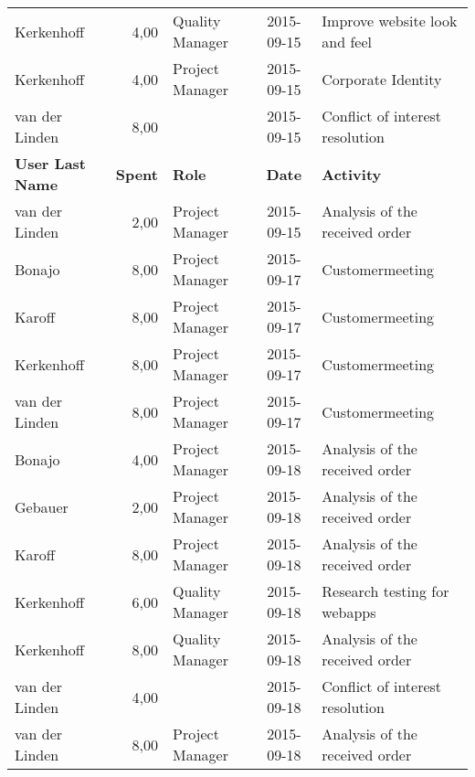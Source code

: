 \begin{longtable}{ l r p{2cm} c p{4cm}}
		Kerkenhoff              & 4,00           & Quality Manager & 2015-09-15    & Improve website look and feel                   \\
		Kerkenhoff              & 4,00           & Project Manager & 2015-09-15    & Corporate Identity                              \\
		van der Linden          & 8,00           &                 & 2015-09-15    & Conflict of interest resolution                 \\
		\textbf{User Last Name} & \textbf{Spent} & \textbf{Role} & \textbf{Date} & \textbf{Activity} \\
		\hline
		van der Linden          & 2,00           & Project Manager & 2015-09-15    & Analysis of the received order                  \\
		Bonajo                  & 8,00           & Project Manager & 2015-09-17    & Customermeeting                                 \\
		Karoff                  & 8,00           & Project Manager & 2015-09-17    & Customermeeting                                 \\
		Kerkenhoff              & 8,00           & Project Manager & 2015-09-17    & Customermeeting                                 \\
		van der Linden          & 8,00           & Project Manager & 2015-09-17    & Customermeeting                                 \\
		Bonajo                  & 4,00           & Project Manager & 2015-09-18    & Analysis of the received order                  \\
		Gebauer                 & 2,00           & Project Manager & 2015-09-18    & Analysis of the received order                  \\
		Karoff                  & 8,00           & Project Manager & 2015-09-18    & Analysis of the received order                  \\
		Kerkenhoff              & 6,00           & Quality Manager & 2015-09-18    & Research testing for webapps                    \\
		Kerkenhoff              & 8,00           & Quality Manager & 2015-09-18    & Analysis of the received order                  \\
		van der Linden          & 4,00           &                 & 2015-09-18    & Conflict of interest resolution                 \\
		van der Linden          & 8,00           & Project Manager & 2015-09-18    & Analysis of the received order                  \\

\end{longtable}
